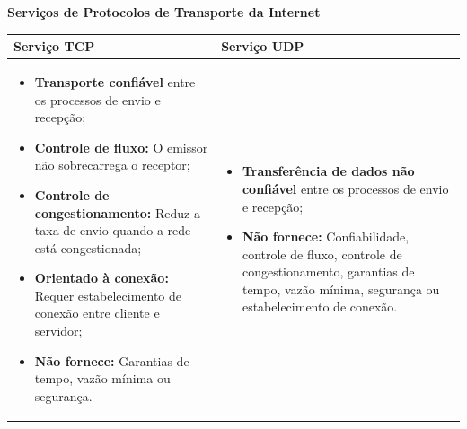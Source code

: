     \textbf{Serviços de Protocolos de Transporte da Internet}
    \begin{table}[ht]
        \centering
        \renewcommand{\arraystretch}{1.2}

        \begin{tabular}{p{} p{}}
            \toprule
            \textbf{Serviço TCP} & \textbf{Serviço UDP} \\
            \midrule

            \begin{itemize}[leftmargin=*,nosep]
                \item \textbf{Transporte confiável} entre os processos de envio e recepção;
                \item \textbf{Controle de fluxo:} O emissor não sobrecarrega o receptor;
                \item \textbf{Controle de congestionamento:} Reduz a taxa de envio quando a rede está congestionada;
                \item \textbf{Orientado à conexão:} Requer estabelecimento de conexão entre cliente e servidor;
                \item \textbf{Não fornece:} Garantias de tempo, vazão mínima ou segurança.
            \end{itemize}

            &

            \begin{itemize}[leftmargin=*,nosep]
                \item \textbf{Transferência de dados não confiável} entre os processos de envio e recepção;
                \item \textbf{Não fornece:} Confiabilidade, controle de fluxo, controle de congestionamento, garantias de tempo, vazão mínima, segurança ou estabelecimento de conexão.
            \end{itemize}

            \\
            \bottomrule
        \end{tabular}

    \end{table}

